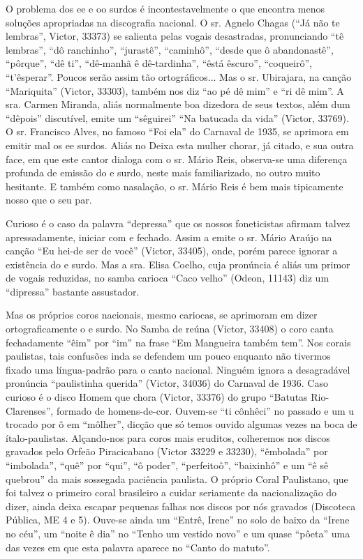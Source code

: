 O problema dos ee e oo surdos é incontestavelmente o que encontra menos
soluções apropriadas na discografia nacional. O sr. Agnelo Chagas (``Já
não te lembras'', Victor, 33373) se salienta pelas vogais desastradas,
pronunciando ``tê lembras'', ``dô ranchinho'', ``jurastê'', ``caminhô'',
``desde que ô abandonastê'', ``pôrque'', ``dê ti'', ``dê-manhã ê
dê-tardinha'', ``êstá êscuro'', ``coqueirô'', ``t'êsperar''. Poucos
serão assim tão ortográficos... Mas o sr. Ubirajara, na canção
``Mariquita'' (Victor, 33303), também nos diz ``ao pé dê mim'' e ``ri dê
mim''. A sra. Carmen Miranda, aliás normalmente boa dizedora de seus
textos, além dum ``dêpois'' discutível, emite um ``sêguirei'' ``Na
batucada da vida'' (Victor, 33769). O sr. Francisco Alves, no famoso
``Foi ela'' do Carnaval de 1935, se aprimora em emitir mal os ee surdos.
Aliás no Deixa esta mulher chorar, já citado, e sua outra face, em que
este cantor dialoga com o sr. Mário Reis, observa-se uma diferença
profunda de emissão do e surdo, neste mais familiarizado, no outro muito
hesitante. E também como nasalação, o sr. Mário Reis é bem mais
tipicamente nosso que o seu par.

Curioso é o caso da palavra ``depressa'' que os nossos foneticistas
afirmam talvez apressadamente, iniciar com e fechado. Assim a emite o
sr. Mário Araújo na canção ``Eu hei-de ser de você'' (Victor, 33405),
onde, porém parece ignorar a existência do e surdo. Mas a sra. Elisa
Coelho, cuja pronúncia é aliás um primor de vogais reduzidas, no samba
carioca ``Caco velho'' (Odeon, 11143) diz um ``dipressa'' bastante
assustador.

Mas os próprios coros nacionais, mesmo cariocas, se aprimoram em dizer
ortograficamente o e surdo. No Samba de reúna (Victor, 33408) o coro
canta fechadamente ``êim'' por ``im'' na frase ``Em Mangueira também
tem''. Nos corais paulistas, tais confusões inda se defendem um pouco
enquanto não tivermos fixado uma língua-padrão para o canto nacional.
Ninguém ignora a desagradável pronúncia ``paulistinha querida'' (Victor,
34036) do Carnaval de 1936. Caso curioso é o disco Homem que chora
(Victor, 33376) do grupo ``Batutas Rio-Clarenses'', formado de
homens-de-cor. Ouvem-se ``ti cônhêci'' no passado e um u trocado por ô
em ``môlher'', dicção que só temos ouvido algumas vezes na boca de
ítalo-paulistas. Alçando-nos para coros mais eruditos, colheremos nos
discos gravados pelo Orfeão Piracicabano (Victor 33229 e 33230),
``êmbolada'' por ``imbolada'', ``quê'' por ``qui'', ``ô poder'',
``perfeitoô'', ``baixinhô'' e um ``ê sê quebrou'' da mais sossegada
paciência paulista. O próprio Coral Paulistano, que foi talvez o
primeiro coral brasileiro a cuidar seriamente da nacionalização do
dizer, ainda deixa escapar pequenas falhas nos discos por nós gravados
(Discoteca Pública, ME 4 e 5). Ouve-se ainda um ``Entrê, Irene'' no solo
de baixo da ``Irene no céu'', um ``noite ê dia'' no ``Tenho um vestido
novo'' e um quase ``pôeta'' uma das vezes em que esta palavra aparece no
``Canto do matuto''.


